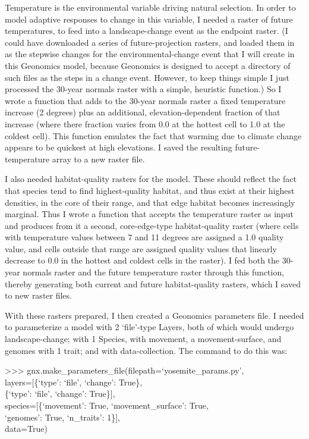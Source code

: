 ﻿\documentclass{article}
\newenvironment{allintypewriter}{\ttfamily}{\par}
\begin{document}
Temperature is the environmental variable driving natural selection.
In order to model adaptive responses to change in this variable, I needed
a raster of future temperatures, to feed into a landscape-change event
as the endpoint raster.
(I could have downloaded a series of future-projection rasters, and loaded
them in as the stepwise changes for the environmental-change event that I will
create in this Geonomics model, because Geonomics is designed to accept a
directory of such files as the steps in a change event. However, to keep
things simple I just processed the 30-year normals raster with a simple,
heuristic function.) So I wrote a function that adds to the 30-year normals
raster a fixed temperature increase (2 degrees) plus an additional,
elevation-dependent fraction of that increase (where there fraction varies
from 0.0 at the hottest cell to 1.0 at the coldest cell). This function
emulates the fact that warming due to climate change appears to be quickest
at high elevations. I saved the resulting future-temperature array to a new
raster file.

I also needed habitat-quality rasters for the model. These should reflect
the fact that species tend to find highest-quality habitat, and thus exist at
their highest densities, in the core of their range, and that edge habitat
becomes increasingly marginal. Thus I wrote a function that accepts the
temperature raster as input and produces from
it a second, core-edge-type habitat-quality raster (where cells with
temperature values between 7 and 11 degrees are assigned a 1.0 quality value,
and cells outside that range are assigned quality values that linearly decrease
to 0.0 in the hottest and coldest cells in the raster). I fed both the 30-year
normals raster and the future temperature raster through this function, thereby
generating both current and future habitat-quality rasters, which I saved to
new raster files.

With these rasters prepared, I then created a Geonomics parameters file.
I needed to parameterize a model with 2 `file'-type Layers,
both of which would undergo landscape-change;
with 1 Species, with movement, a movement-surface, and
genomes with 1 trait; and with data-collection.
The command to do this was:

\begin{allintypewriter}
>>> gnx.make\_parameters\_file(filepath=`yosemite\_params.py',\\
                               layers=[\{`type': `file', `change': True\},\\
                                       \{`type': `file', `change': True\}],\\
                               species=[\{`movement': True, `movement\_surface': True,\\
                                          `genomes': True, `n\_traits': 1\}],\\
                               data=True)\\
\end{allintypewriter}
\end{document}
